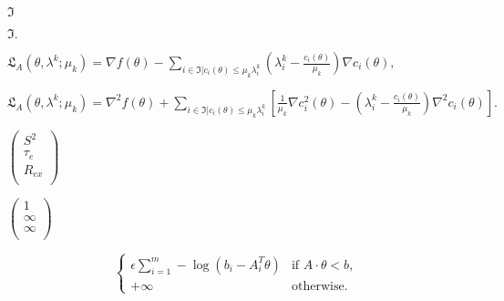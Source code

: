 \documentclass[a4paper,11pt,twoside,openright]{book}
\def\lthtmlcheckvsize{\ifdim\ht\sizebox<\vsize 
  \ifdim\wd\sizebox<\hsize\expandafter\hfill\fi \expandafter\vfill
  \else\expandafter\vss\fi}%
\begin{document}
{\newpage\clearpage
{}%
$ \mathfrak{I}$%
\lthtmlindisplaymathZ
\lthtmlcheckvsize\clearpage}

{\newpage\clearpage
{}%
$\displaystyle \mathfrak{I}.$%
\lthtmlindisplaymathZ
\lthtmlcheckvsize\clearpage}

{\newpage\clearpage
{}%
$\displaystyle \mathfrak{L}_A(\theta, \lambda^k; \mu_k) =
\nabla f(\theta)
- \sum_{i \in \mathfrak{I} | c_i(\theta) \leqslant \mu_k \lambda_i^k}
\left( \lambda_i^k - \frac{c_i(\theta)}{\mu_k} \right) \nabla c_i(\theta),$%
\lthtmlindisplaymathZ
\lthtmlcheckvsize\clearpage}

{\newpage\clearpage
{}%
$\displaystyle \mathfrak{L}_A(\theta, \lambda^k; \mu_k) =
\nabla^2 f(\theta)
+ \sum_{i \in \mathfrak{I} | c_i(\theta) \leqslant \mu_k \lambda_i^k}
\left[
\frac{1}{\mu_k} \nabla c_i^2(\theta)
- \left( \lambda_i^k - \frac{c_i(\theta)}{\mu_k} \right) \nabla^2 c_i(\theta)
\right].$%
\lthtmlindisplaymathZ
\lthtmlcheckvsize\clearpage}

{\newpage\clearpage
{}%
$\displaystyle \begin{pmatrix}
S^2 \\
\tau_e \\
R_{ex} \\
\end{pmatrix}$%
\lthtmlindisplaymathZ
\lthtmlcheckvsize\clearpage}

{\newpage\clearpage
{}%
$\displaystyle \begin{pmatrix}
1 \\
\infty \\
\infty \\
\end{pmatrix}$%
\lthtmlindisplaymathZ
\lthtmlcheckvsize\clearpage}

{\newpage\clearpage
{}%
\begin{displaymath}\begin{cases}

\epsilon \sum_{i=1}^m -\log(b_i - A_i^T\theta) & \textrm{if } A \cdot \theta < b, \\
+\infty & \textrm{otherwise}.
\end{cases}
\end{displaymath}%
\lthtmldisplayZ
\lthtmlcheckvsize\clearpage}
\end{document}
